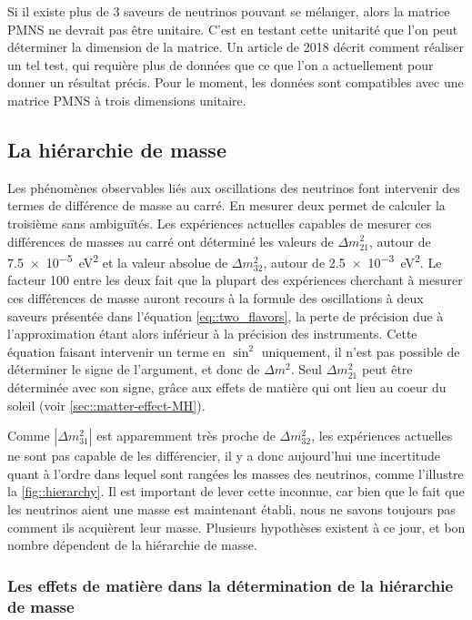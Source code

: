             Si il existe plus de 3 saveurs de neutrinos pouvant se mélanger, alors la matrice PMNS ne devrait pas être unitaire. C'est en testant cette unitarité que l'on peut déterminer la dimension de la matrice. Un article de 2018\cite{Qian2013} décrit comment réaliser un tel test, qui requière plus de données que ce que l'on a actuellement pour donner un résultat précis. Pour le moment, les données sont compatibles avec une matrice PMNS à trois dimensions unitaire.
            
        
        \subsection{La hiérarchie de masse}\label{sec::hierarchy}
            Les phénomènes observables liés aux oscillations des neutrinos font intervenir des termes de différence de masse au carré. En mesurer deux permet de calculer la troisième sans ambiguïtés. Les expériences actuelles capables de mesurer ces différences de masses au carré ont déterminé les valeurs de $\Delta m_{21}^2$, autour de \SI{7.5e-5}{\electronvolt\squared}\cite{pdg2018} et la valeur absolue de $\Delta m_{32}^2$, autour de \SI{2.5e-3}{\electronvolt\squared}\cite{pdg2018}. Le facteur 100 entre les deux fait que la plupart des expériences cherchant à mesurer ces différences de masse auront recours à la formule des oscillations à deux saveurs présentée dans l'équation \eqref{eq::two_flavors}\cite{Collaboration2011}, la perte de précision due à l'approximation étant alors inférieur à la précision des instruments. Cette équation faisant intervenir un terme en $\sin^2$ uniquement, il n'est pas possible de déterminer le signe de l'argument, et donc de $\Delta m^2$. Seul $\Delta m_{21}^2$ peut être déterminée avec son signe, grâce aux effets de matière qui ont lieu au coeur du soleil (voir \autoref{sec::matter-effect-MH}).
            
            Comme $|\Delta m_{31}^2|$ est apparemment très proche de $\Delta m_{32}^2$, les expériences actuelles ne sont pas capable de les différencier, il y a donc aujourd'hui une incertitude quant à l'ordre dans lequel sont rangées les masses des neutrinos, comme l'illustre la \autoref{fig::hierarchy}. Il est important de lever cette inconnue, car bien que le fait que les neutrinos aient une masse est maintenant établi, nous ne savons toujours pas comment ils acquièrent leur masse. Plusieurs hypothèses existent à ce jour, et bon nombre dépendent de la hiérarchie de masse.
            
            \subsubsection{Les effets de matière dans la détermination de la hiérarchie de masse}\label{sec::matter-effect-MH}
